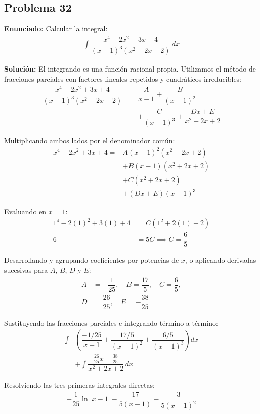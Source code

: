 \subsection*{Problema 32}

\textbf{Enunciado:} Calcular la integral:
\begin{align*}
\int \dfrac{x^4 - 2x^2 + 3x + 4}{(x - 1)^3 (x^2 + 2x + 2)} \, dx
\end{align*}

\textbf{Solución:} 
El integrando es una función racional propia. 
Utilizamos el método de fracciones parciales 
con factores lineales repetidos y cuadráticos 
irreducibles:
\begin{align*}
\dfrac{x^4 - 2x^2 + 3x + 4}{(x - 1)^3 (x^2 + 2x + 2)} = 
&\dfrac{A}{x - 1} + \dfrac{B}{(x - 1)^2} \\
&+ \dfrac{C}{(x - 1)^3} + \dfrac{Dx + E}{x^2 + 2x + 2}
\end{align*}

Multiplicando ambos lados por el denominador común:
\begin{align*}
x^4 - 2x^2 + 3x + 4 = 
&A(x - 1)^2(x^2 + 2x + 2) \\
&+ B(x - 1)(x^2 + 2x + 2) \\
&+ C(x^2 + 2x + 2) \\
&+ (Dx + E)(x - 1)^3
\end{align*}

Evaluando en $x = 1$:
\begin{align*}
1^4 - 2(1)^2 + 3(1) + 4 &= C(1^2 + 2(1) + 2) \\
6 &= 5C \implies C = \dfrac{6}{5}
\end{align*}

Desarrollando y agrupando coeficientes por potencias de $x$, 
o aplicando derivadas sucesivas para $A$, $B$, $D$ y $E$:
\begin{align*}
A &= -\dfrac{1}{25}, \quad B = \dfrac{17}{5}, \quad C = \dfrac{6}{5}, \\
D &= \dfrac{26}{25}, \quad E = -\dfrac{38}{25}
\end{align*}

Sustituyendo las fracciones parciales e integrando 
término a término:
\begin{align*}
\int &\left( \dfrac{-1/25}{x - 1} + \dfrac{17/5}{(x - 1)^2} + \dfrac{6/5}{(x - 1)^3} \right) dx \\
&+ \int \dfrac{\frac{26}{25}x - \frac{38}{25}}{x^2 + 2x + 2} \, dx
\end{align*}

Resolviendo las tres primeras integrales directas:
\begin{align*}
-\dfrac{1}{25}\ln|x - 1| - \dfrac{17}{5(x - 1)} - \dfrac{3}{5(x - 1)^2}
\end{align*}

